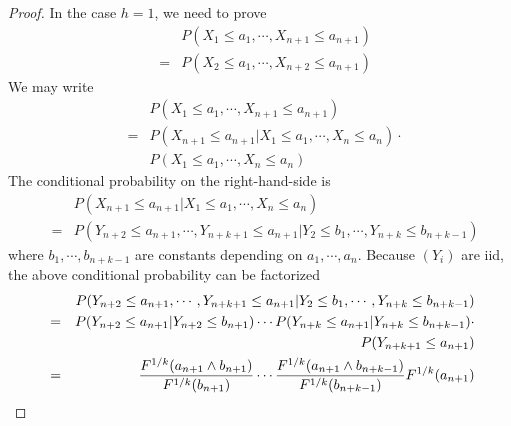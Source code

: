 \documentclass{report}
\begin{document}
\begin{enumerate}[1.]
\begin{enumerate}[(a)]
\begin{proof}
      In the case $h=1$, we need to prove
      \begin{eqnarray*}
        && P(X_1 \le a_1, \cdots, X_{n+1} \le a_{n+1}) \\
        &=& P(X_2 \le a_1, \cdots, X_{n+2} \le a_{n+1})
      \end{eqnarray*}
      We may write
      \begin{eqnarray*}
        && P(X_1 \le a_1, \cdots, X_{n+1} \le a_{n+1}) \\
        &=& P(X_{n+1} \le a_{n+1} | X_1 \le a_1, \cdots, X_{n} \le
        a_{n}) \cdot \\
        && P(X_1 \le a_1, \cdots, X_{n} \le a_{n})
      \end{eqnarray*}
      The conditional probability on the right-hand-side is
      \begin{eqnarray*}
        && P(X_{n+1} \le a_{n+1} | X_1 \le a_1, \cdots, X_{n} \le
        a_{n}) \\
        &=& P(Y_{n+2} \le a_{n+1}, \cdots, Y_{n+k+1} \le a_{n+1} | Y_2
        \le b_1, \cdots, Y_{n+k} \le b_{n+k-1})
      \end{eqnarray*}
      where $b_1, \cdots, b_{n+k-1}$ are constants depending on $a_1,
      \cdots, a_n$. Because $(Y_i)$ are iid, the above conditional
      probability can be factorized
      \begin{eqnarray*}
        && P(Y_{n+2} \le a_{n+1}, \cdots, Y_{n+k+1} \le a_{n+1} | Y_2
        \le b_1, \cdots, Y_{n+k} \le b_{n+k-1}) \\
        &=& P(Y_{n+2} \le a_{n+1} | Y_{n+2} \le b_{n+1}) \cdots
        P(Y_{n+k} \le a_{n+1} | Y_{n+k} \le b_{n+k-1}) \cdot \\
        && P(Y_{n+k+1} \le a_{n+1}) \\
        &=& {F^{1/k}(a_{n+1} \wedge b_{n+1}) \over F^{1/k}(b_{n+1})} \cdots
        {F^{1/k}(a_{n+1} \wedge b_{n+k-1}) \over F^{1/k}(b_{n+k-1})}
        F^{1/k}(a_{n+1})
      \end{eqnarray*}
      

\end{proof}
\end{enumerate}
\end{enumerate}
\end{document}
